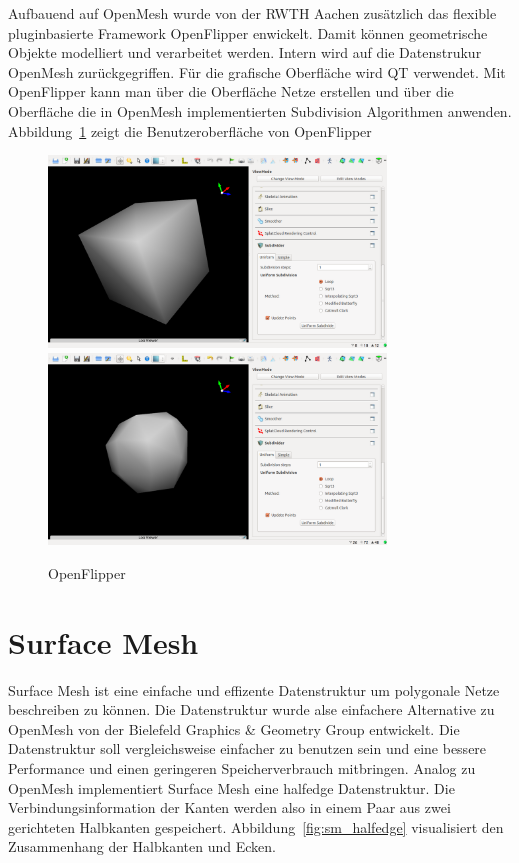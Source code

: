 Aufbauend auf OpenMesh wurde von der \acs{RWTH} Aachen zusätzlich das flexible pluginbasierte Framework OpenFlipper enwickelt.
Damit können geometrische Objekte modelliert und verarbeitet werden. Intern wird auf die Datenstrukur OpenMesh zurückgegriffen.
Für die grafische Oberfläche wird QT verwendet.
Mit OpenFlipper kann man über die Oberfläche Netze erstellen und über die Oberfläche die in OpenMesh implementierten Subdivision Algorithmen anwenden.
Abbildung~\ref{fig:openflipper} zeigt die Benutzeroberfläche von OpenFlipper
\begin{figure}[h]
  \caption{OpenFlipper}
  \centering
  \includegraphics[width=0.8\textwidth]{content/media/openflipper_cube}
  \includegraphics[width=0.8\textwidth]{content/media/openflipper_loop}
  \label{fig:openflipper}
\end{figure}


\section{Surface Mesh}

Surface Mesh ist eine einfache und effizente Datenstruktur um polygonale Netze beschreiben zu können.
Die Datenstruktur wurde alse einfachere Alternative zu OpenMesh von der Bielefeld Graphics \& Geometry Group entwickelt.
Die Datenstruktur soll vergleichsweise einfacher zu benutzen sein und eine bessere Performance und einen geringeren Speicherverbrauch mitbringen.
Analog zu OpenMesh implementiert Surface Mesh eine halfedge Datenstruktur.
Die Verbindungsinformation der Kanten werden also in einem Paar aus zwei gerichteten Halbkanten gespeichert.
Abbildung~\ref{fig:sm_halfedge} visualisiert den Zusammenhang der Halbkanten und Ecken.

